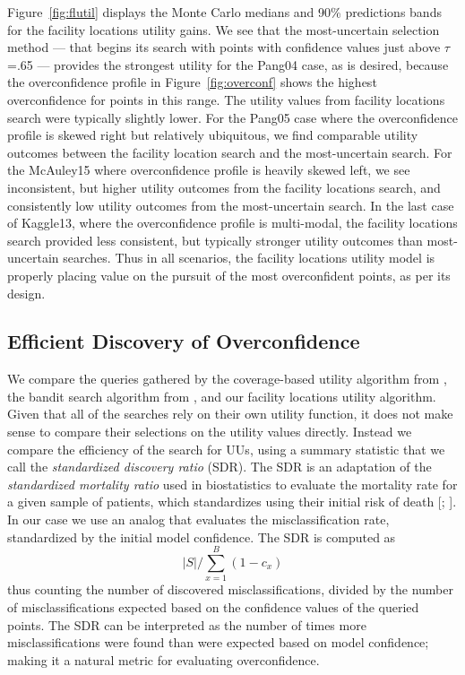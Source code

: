\documentclass[letterpaper]{article} %
\begin{document}
Figure~\ref{fig:flutil} displays the Monte Carlo medians and 90\% predictions bands for the facility locations utility gains. We see that the most-uncertain selection method --- that begins its search with points with confidence values just above $\tau$=.65 --- provides the strongest utility for the Pang04 case, as is desired, because the overconfidence profile in Figure~\ref{fig:overconf} shows the highest overconfidence for points in this range. The utility values from facility locations search were typically slightly lower. For the Pang05 case where the overconfidence profile is skewed right but relatively ubiquitous, we find comparable utility outcomes between the facility location search and the most-uncertain search. For the McAuley15 where overconfidence profile is heavily skewed left, we see inconsistent, but higher utility outcomes from the facility locations search, and consistently low utility outcomes from the most-uncertain search. In the last case of Kaggle13, where the overconfidence profile is multi-modal, the facility locations search provided less consistent, but typically stronger utility outcomes than most-uncertain searches. Thus in all scenarios, the facility locations utility model is properly placing value on the pursuit of the most overconfident points, as per its design.

\subsection{Efficient Discovery of Overconfidence}

We compare the queries gathered by the coverage-based utility algorithm from \cite{Bansal2018}, the bandit search algorithm from \cite{Lakkaraju2016}, and our facility locations utility algorithm. Given that all of the searches rely on their own utility function, it does not make sense to compare their selections on the utility values directly. Instead we compare the efficiency of the search for UUs, using a summary statistic that we call the \textit{standardized discovery ratio} (SDR). The SDR is an adaptation of the \textit{standardized mortality ratio} used in biostatistics to evaluate the mortality rate for a given sample of patients, which standardizes using their initial risk of death [\citealt{taylor2013standardized}; \citealt{rosner2015fundamentals}]. In our case we use an analog that evaluates the misclassification rate, standardized by the initial model confidence. The SDR is computed as 
$$ |S| / \sum_{x=1}^B(1- c_x) $$
thus counting the number of discovered misclassifications, divided by the number of misclassifications expected based on the confidence values of the queried points. The SDR can be interpreted as the number of times more misclassifications were found than were expected based on model confidence; making it a natural metric for evaluating overconfidence.
\end{document}
